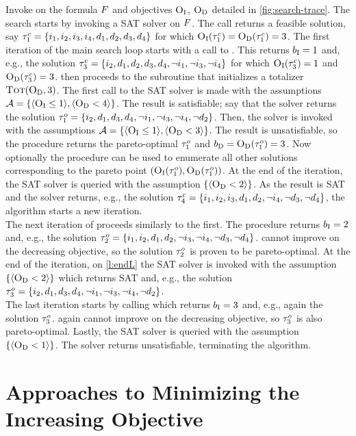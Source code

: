 \begin{example}\label{ex:main-iteration}
  Invoke \algname{} on the formula $F$ and objectives $\textsc{O}_{\text{I}}$, $\textsc{O}_{\text{D}}$ detailed in \cref{fig:search-trace}. 
  The search starts by invoking a SAT solver on $F$.
  The call returns a feasible solution, say $\tau^c_1 = {\{i_1,\allowbreak i_2,\allowbreak i_3,\allowbreak i_4,\allowbreak d_1,\allowbreak d_2,\allowbreak d_3,\allowbreak d_4\}}$ for which $\textsc{O}_{\text{I}}(\tau^c_1) = \textsc{O}_{\text{D}}(\tau^c_1) = 3$. 
  The first iteration of the main search loop starts with a call to \Min{}.
  This returns $b_{\text{I}} = 1$ and, e.g., the solution $\tau^c_3 = {\{i_2,\allowbreak d_1,\allowbreak d_2,\allowbreak d_3,\allowbreak d_4,\allowbreak \lnot i_1,\allowbreak \lnot i_3,\allowbreak \lnot i_4\}}$ for which $\textsc{O}_{\text{I}}(\tau^c_3) = 1$ and $\textsc{O}_{\text{D}}(\tau^c_3) = 3$.
  \algname{} then proceeds to the \Simpr{} subroutine that initializes a totalizer $\textsc{Tot}(\textsc{O}_{\text{D}}, 3)$.
  The first call to the SAT solver is made with the assumptions $\mathcal{A} = \{ \langle \textsc{O}_{\text{I}} \leq 1 \rangle, \langle \textsc{O}_{\text{D}} < 4 \rangle \}$.
  The result is satisfiable;
  say that the solver returns the solution $\tau^o_1 = {\{i_2,\allowbreak d_1,\allowbreak d_3,\allowbreak d_4,\allowbreak \lnot i_1,\allowbreak \lnot i_3,\allowbreak \lnot i_4,\allowbreak \lnot d_2\}}$.
  Then, the solver is invoked with the assumptions $\mathcal{A} =  \{ \langle \textsc{O}_{\text{I}} \leq 1 \rangle, \langle \textsc{O}_{\text{D}} < 3 \rangle \}$.
  The result is unsatisfiable, so the procedure returns the pareto-optimal $\tau^o_1$ and $b_{\text{D}} = \textsc{O}_{\text{D}}(\tau^o_1) = 3$.
  Now optionally the procedure \E can be used to enumerate all other solutions corresponding to the pareto point $(\textsc{O}_{\text{I}}(\tau^o_1),\textsc{O}_{\text{D}}(\tau^o_1))$.
  At the end of the iteration, the SAT solver is queried with the assumption $\{ \langle \textsc{O}_{\text{D}} < 2 \rangle \}$.
  As the result is SAT and the solver returns, e.g., the solution $\tau^c_4 = {\{i_1,\allowbreak i_2,\allowbreak i_3,\allowbreak d_1,\allowbreak d_2,\allowbreak \lnot i_4,\allowbreak \lnot d_3,\allowbreak \lnot d_4\}}$,
  the algorithm starts a new iteration. \\
  The next iteration of \algname{} proceeds similarly to the first.
  The procedure \Min{} returns $b_{\text{I}} = 2$ and, e.g., the solution $\tau^o_2 = {\{i_1,\allowbreak i_2,\allowbreak d_1,\allowbreak d_2,\allowbreak \lnot i_3,\allowbreak \lnot i_4,\allowbreak \lnot d_3,\allowbreak \lnot d_4\}}$.
  \Simpr{} cannot improve on the decreasing objective, so the solution $\tau^o_2$ is proven to be pareto-optimal.
  At the end of the iteration, on \cref{l:endL} the SAT solver is invoked with the assumption $\{\langle \textsc{O}_{\text{D}} < 2 \rangle\}$ which returns SAT and, e.g., the solution $\tau^o_3 = {\{i_2,\allowbreak d_1,\allowbreak d_3,\allowbreak d_4,\allowbreak \lnot i_1,\allowbreak \lnot i_3,\allowbreak \lnot i_4,\allowbreak \lnot d_2\}}$. \\
  The last iteration starts by calling \Min{} which returns $b_{\text{I}} = 3$ and, e.g., again the solution $\tau^o_3$.
  \Simpr{} again cannot improve on the decreasing objective, so $\tau^o_3$ is also pareto-optimal.
  Lastly, the SAT solver is queried with the assumption $\{\langle \textsc{O}_{\text{D}} < 1 \rangle\}$.
  The solver returns unsatisfiable, terminating the algorithm. 
\end{example}

\section{Approaches to Minimizing the Increasing Objective\label{sec:variants}}

